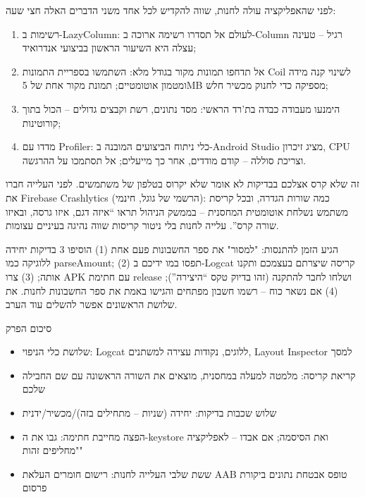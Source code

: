 
לפני שהאפליקציה עולה לחנות, שווה להקדיש לכל אחד משני הדברים האלה חצי שעה:


\begin{enumerate}
  \item רשימות ב-LazyColumn: לעולם אל תסדרו רשימה ארוכה ב-Column רגיל – טעינה עצלה היא השיעור הראשון בביצועי אנדרואיד;
  \item אל תדחפו תמונות מקור בגודל מלא: השתמשו בספריית התמונות Coil לשינוי קנה מידה ומטמון אוטומטיים; תמונת מקור אחת של 5MB מספיקה כדי לחנוק מכשיר חלש;
  \item הימנעו מעבודה כבדה בת'רד הראשי: מסד נתונים, רשת וקבצים גדולים – הכול בתוך קורוטינות;
  \item מדדו עם Profiler: כלי ניתוח הביצועים המובנה ב-Android Studio מציג זיכרון, CPU וצריכת סוללה – קודם מודדים, אחר כך מייעלים; אל תסתמכו על ההרגשה.
\end{enumerate}


זה שלא קרס אצלכם בבדיקות לא אומר שלא יקרוס בטלפון של משתמשים. לפני העלייה חברו את Firebase Crashlytics (הרשמי של גוגל, חינמי): כמה שורות הגדרה, ובכל קריסת משתמש נשלחת אוטומטית המחסנית – בממשק הניהול תראו “איזה דגם, איזו גרסה, ובאיזו שורה קרס”. עלייה לחנות בלי ניטור קריסות שווה נהיגה בעיניים עצומות.

\begin{tcbpractice}{הגיע הזמן להתנסות: "למסור" את ספר החשבונות פעם אחת}
(1) הוסיפו 3 בדיקות יחידה ללוגיקה כמו parseAmount; (2) תפסו במו ידיכם ב-Logcat קריסה שיצרתם בעצמכם ותקנו אותה; (3) צרו APK עם חתימת release ושלחו לחבר להתקנה (זהו בדיוק טקס “היצירה”); (4) אם נשאר כוח – רשמו חשבון מפתחים והגישו באמת את ספר החשבונות לחנות. את שלושת הראשונים אפשר להשלים עוד הערב.

\end{tcbpractice}

\begin{tcbsummary}{סיכום הפרק}
\begin{itemize}
  \item שלושת כלי הניפוי: Logcat ללוגים, נקודות עצירה למשתנים, Layout Inspector למסך
  \item קריאת קריסה: מלמטה למעלה במחסנית, מוצאים את השורה הראשונה עם שם החבילה שלכם
  \item שלוש שכבות בדיקות: יחידה (שניות – מתחילים בזה)/מכשיר/ידנית
  \item הפצה מחייבת חתימה: גבו את ה-keystore ואת הסיסמה; אם אבדו – לאפליקציה "מחליפים זהות"
  \item ששת שלבי העלייה לחנות: רישום חומרים העלאת AAB טופס אבטחת נתונים ביקורת פרסום
\end{itemize}

\end{tcbsummary}
